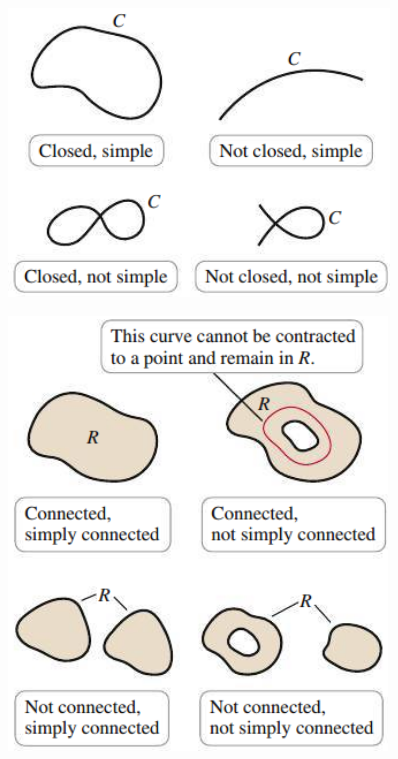 \documentclass[../mathNotesPreamble]{subfiles}
\begin{document}
  \noindent
  \begin{minipage}{0.5\linewidth}
    \begin{center}
      \includegraphics[width=0.9\linewidth]{../images/briggs_17_03/fig17_28}
    \end{center}
  \end{minipage}%
  \begin{minipage}{0.5\linewidth}
    \begin{center}
      \includegraphics[width=0.8\linewidth]{../images/briggs_17_03/fig17_29}
    \end{center}
  \end{minipage}%
\end{document}
